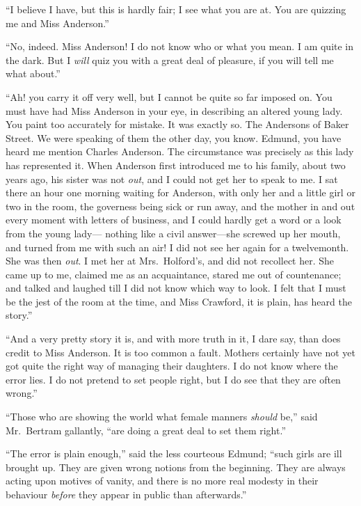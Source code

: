 ``I believe I have, but this is hardly fair; I see what you
are at.  You are quizzing me and Miss Anderson.''

``No, indeed.  Miss Anderson!  I do not know who or what
you mean.  I am quite in the dark.  But I \emph{will} quiz you
with a great deal of pleasure, if you will tell me what about.''

``Ah! you carry it off very well, but I cannot be quite
so far imposed on.  You must have had Miss Anderson
in your eye, in describing an altered young lady.
You paint too accurately for mistake.  It was exactly so.
The Andersons of Baker Street.  We were speaking of them
the other day, you know.  Edmund, you have heard me mention
Charles Anderson.  The circumstance was precisely as this
lady has represented it.  When Anderson first introduced
me to his family, about two years ago, his sister was
not \emph{out}, and I could not get her to speak to me.
I sat there an hour one morning waiting for Anderson,
with only her and a little girl or two in the room,
the governess being sick or run away, and the mother
in and out every moment with letters of business, and I
could hardly get a word or a look from the young lady---%
nothing like a civil answer---she screwed up her mouth,
and turned from me with such an air!  I did not see
her again for a twelvemonth.  She was then \emph{out}.
I met her at Mrs.\ Holford's, and did not recollect her.
She came up to me, claimed me as an acquaintance, stared me
out of countenance; and talked and laughed till I did not
know which way to look.  I felt that I must be the jest
of the room at the time, and Miss Crawford, it is plain,
has heard the story.''

``And a very pretty story it is, and with more truth
in it, I dare say, than does credit to Miss Anderson.
It is too common a fault.  Mothers certainly have not yet
got quite the right way of managing their daughters.
I do not know where the error lies.  I do not pretend to set
people right, but I do see that they are often wrong.''

``Those who are showing the world what female manners
\emph{should} be,'' said Mr.\ Bertram gallantly, ``are doing
a great deal to set them right.''

``The error is plain enough,'' said the less courteous Edmund;
``such girls are ill brought up.  They are given wrong notions
from the beginning.  They are always acting upon motives
of vanity, and there is no more real modesty in their
behaviour \emph{before} they appear in public than afterwards.''

